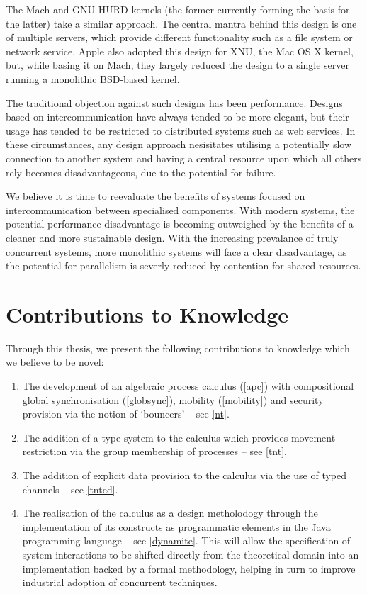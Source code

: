 The Mach and GNU HURD kernels (the former currently forming the basis
for the latter) take a similar approach.  The central mantra behind
this design is one of multiple servers, which provide different
functionality such as a file system or network service.  Apple also
adopted this design for XNU, the Mac OS X kernel, but, while basing it
on Mach, they largely reduced the design to a single server running a
monolithic BSD-based kernel.

The traditional objection against such designs has been performance.
Designs based on intercommunication have always tended to be more
elegant, but their usage has tended to be restricted to distributed
systems such as web services.  In these circumstances, any design
approach nesisitates utilising a potentially slow connection to
another system and having a central resource upon which all others
rely becomes disadvantageous, due to the potential for failure.

We believe it is time to reevaluate the benefits of systems focused on
intercommunication between specialised components.  With modern
systems, the potential performance disadvantage is becoming outweighed
by the benefits of a cleaner and more sustainable design.  With the
increasing prevalance of truly concurrent systems, more monolithic
systems will face a clear disadvantage, as the potential for
parallelism is severly reduced by contention for shared resources.

\section{Contributions to Knowledge}

Through this thesis, we present the following contributions to
knowledge which we believe to be novel:

\begin{enumerate}
\item The development of an algebraic process calculus (\ref{apc})
  with compositional global synchronisation (\ref{globsync}), mobility
  (\ref{mobility}) and security provision via the notion of `bouncers'
  -- see \ref{nt}.
\item The addition of a type system to the calculus which provides
  movement restriction via the group membership of processes -- see
  \ref{tnt}.
\item The addition of explicit data provision to the calculus via the
  use of typed channels -- see \ref{tnted}.
\item The realisation of the calculus as a design metholodogy through
  the implementation of its constructs as programmatic elements in the
  Java programming language -- see \ref{dynamite}.  This will allow
  the specification of system interactions to be shifted directly from
  the theoretical domain into an implementation backed by a formal
  methodology, helping in turn to improve industrial adoption of
  concurrent techniques.
\end{enumerate}

